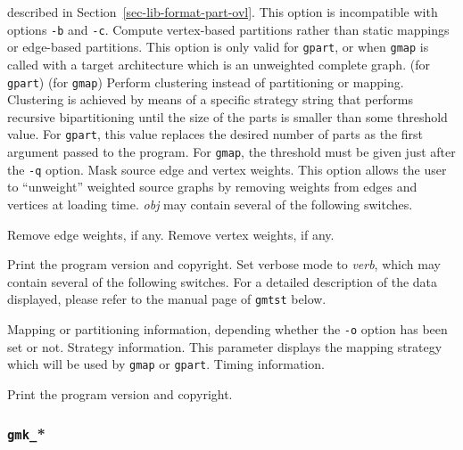 \begin{itemize}
\begin{itemize}
described in Section~\ref{sec-lib-format-part-ovl}.
This option is incompatible with options \texttt{-b} and
\texttt{-c}.
\iteme[\texttt{-o}]
Compute vertex-based partitions rather than static mappings or
edge-based partitions. This option is only valid for \texttt{gpart}, or
when \texttt{gmap} is called with a target architecture which is an
unweighted complete graph.
\iteme[\texttt{-q}] (for \texttt{gpart})
 (for \texttt{gmap})
Perform clustering instead of partitioning or mapping. Clustering is
achieved by means of a specific strategy string that performs
recursive bipartitioning until the size of the parts is smaller than
some threshold value. For \texttt{gpart}, this value replaces the desired
number of parts as the first argument passed to the program. For
\texttt{gmap}, the threshold must be given just after the \texttt{-q} option.
Mask source edge and vertex weights. This option allows the user to
``unweight'' weighted source graphs by removing weights from edges and
vertices at loading time. {\it obj\/} may contain several of the following
switches.
\begin{itemize}
\iteme[\texttt{e}]
Remove edge weights, if any.
\iteme[\texttt{v}]
Remove vertex weights, if any.
\end{itemize}
\iteme[\texttt{-V}]
Print the program version and copyright.
Set verbose mode to {\it verb}, which may contain several of the following
switches. For a detailed description of the data displayed, please
refer to the manual page of \texttt{gmtst} below.
\begin{itemize}
\iteme[\texttt{m}]
Mapping or partitioning information, depending whether the \texttt{-o}
option has been set or not.
\iteme[\texttt{s}]
Strategy information. This parameter displays the mapping
strategy which will be used by \texttt{gmap} or \texttt{gpart}.
\iteme[\texttt{t}]
Timing information.
\end{itemize}
\iteme[\texttt{-V}]
Print the program version and copyright.
\end{itemize}
\end{itemize}

\subsubsection{\texttt{gmk\_}*}

